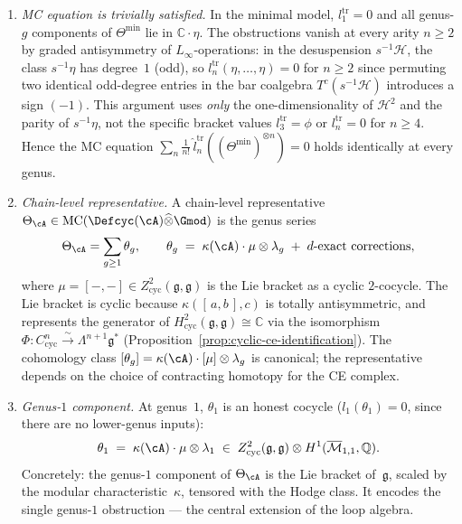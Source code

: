 \begin{theorem}
\begin{enumerate}[label=\textup{(\alph*)}]
\item \emph{MC equation is trivially satisfied.}
  In the minimal model, $l_1^{\mathrm{tr}} = 0$ and all genus-$g$
  components of $\Theta^{\min}$ lie in $\mathbb{C}\!\cdot\!\eta$.
  The obstructions vanish at every arity $n \geq 2$ by
  graded antisymmetry of $L_\infty$-operations: in the
  desuspension $s^{-1}\mathcal{H}$, the class
  $s^{-1}\eta$ has degree~$1$ \textup{(}odd\textup{)}, so
  $l_n^{\mathrm{tr}}(\eta, \ldots, \eta) = 0$ for $n \geq 2$
  since permuting two identical odd-degree entries
  in the bar coalgebra $T^c(s^{-1}\mathcal{H})$ introduces
  a sign $(-1)$.
  This argument uses \emph{only} the one-dimensionality
  of $\mathcal{H}^2$ and the parity of $s^{-1}\eta$, not the
  specific bracket values $l_3^{\mathrm{tr}} = \phi$ or
  $l_n^{\mathrm{tr}} = 0$ for $n \geq 4$.
  Hence the MC equation $\sum_n \frac{1}{n!}\,
  \hat{l}_n^{\mathrm{tr}}((\Theta^{\min})^{\otimes n}) = 0$
  holds identically at every genus.

\item \emph{Chain-level representative.}
  A chain-level representative
  $\Theta_{\cA} \in
  \operatorname{MC}(\Defcyc(\cA)\widehat{\otimes}\Gmod)$
  is the genus series
  \begin{equation}\label{eq:theta-chain}
  \Theta_{\cA} = \sum_{g \geq 1} \theta_g,
  \qquad
  \theta_g \;=\; \kappa(\cA) \cdot \mu \otimes \lambda_g
  \;+\; d\text{-exact corrections},
  \end{equation}
  where $\mu = [-,-] \in Z^2_{\mathrm{cyc}}(\mathfrak{g},
  \mathfrak{g})$ is the Lie bracket as a cyclic $2$-cocycle.
  The Lie bracket is cyclic because
  $\kappa([\,a,b\,],c)$ is totally antisymmetric, and
  represents the generator of
  $H^2_{\mathrm{cyc}}(\mathfrak{g},\mathfrak{g}) \cong
  \mathbb{C}$ via the isomorphism
  $\Phi \colon C^n_{\mathrm{cyc}} \xrightarrow{\sim}
  \Lambda^{n+1}\mathfrak{g}^*$
  \textup{(}Proposition~\textup{\ref{prop:cyclic-ce-identification}}\textup{)}.
  The cohomology class $[\theta_g] =
  \kappa(\cA)\cdot[\mu]\otimes\lambda_g$ is canonical;
  the representative depends on the choice of contracting homotopy
  for the CE complex.

\item \emph{Genus-$1$ component.}
  At genus~$1$, $\theta_1$ is an honest cocycle
  \textup{(}$l_1(\theta_1) = 0$, since there are no lower-genus
  inputs\textup{)}:
  \begin{equation}\label{eq:theta-genus1}
  \theta_1 \;=\; \kappa(\cA) \cdot \mu \otimes \lambda_1
  \;\in\;
  Z^2_{\mathrm{cyc}}(\mathfrak{g},\mathfrak{g})
  \otimes H^1(\overline{\mathcal{M}}_{1,1},\mathbb{Q}).
  \end{equation}
  Concretely: the genus-$1$ component of $\Theta_{\cA}$ is the
  Lie bracket of~$\mathfrak{g}$, scaled by the modular
  characteristic~$\kappa$, tensored with the Hodge class.
  It encodes the single genus-$1$ obstruction --- the central
  extension of the loop algebra.


\end{enumerate}
\end{theorem}
